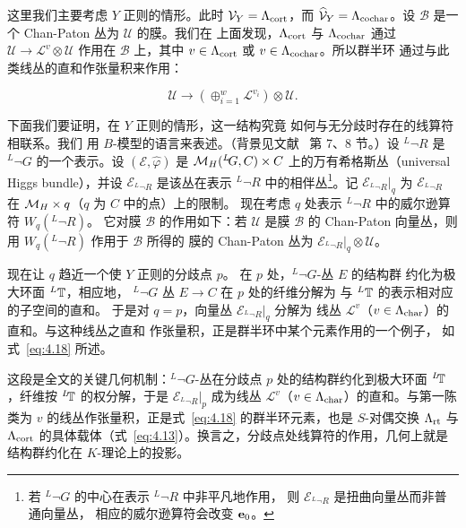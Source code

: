 这里我们主要考虑 $Y$ 正则的情形。此时 ${\mathcal
V}_Y=\Lambda_{\rm cort}$，而 $\widehat {\mathcal V}_Y=\Lambda_{\rm cochar}$。设
${\mathcal B}$ 是一个 Chan-Paton 丛为 ${\mathcal U}$ 的膜。我们在
上面发现，$\Lambda_{\rm cort}$ 与 $\Lambda_{\rm cochar}$ 通过 ${\mathcal U}\to {\mathcal L}^v\otimes {\mathcal U}$
作用在 ${\mathcal B}$ 上，其中 $v\in\Lambda_{\rm cort}$ 或 $v\in\Lambda_{\rm cochar}$。所以群半环
通过与此类线丛的直和作张量积来作用：

\setcounter{equation}{17}
\begin{equation}\label{eq:4.18}
  {\mathcal U}\to \left(\oplus_{i=1}^w{\mathcal
L}^{v_i}\right)\otimes {\mathcal U}.
\end{equation}


下面我们要证明，在 $Y$ 正则的情形，这一结构究竟
如何与无分歧时存在的线算符相联系。我们
用 $B$-模型的语言来表述。（背景见文献~\cite{ref8} 第 7、8 节。）设
$^L\neg R$ 是 $^L\neg G$ 的一个表示。设 $({\mathcal
E},\hat\varphi)$ 是 ${{\mathcal{M}}_H}(^L\negthinspace
G,C)\times C$ 上的万有希格斯丛（universal Higgs bundle），并设 ${\mathcal E}_{^L\neg R}$ 是该丛在表示
$^L\neg R$ 中的相伴丛\footnote{若 $^L\neg G$ 的中心在表示 $^L\neg R$ 中非平凡地作用，
则 ${\mathcal E}_{^L\neg R}$ 是扭曲向量丛而非普通向量丛，
相应的威尔逊算符会改变 ${\bf e}_0$。}。记 ${\mathcal E}_{^L\neg R}|_q$ 为
${\mathcal E}_{^L\neg R}$ 在 ${{\mathcal{M}}_H}\times q$（$q$ 为 $C$ 中的点）上的限制。
现在考虑 $q$ 处表示 $^L\neg R$ 中的威尔逊算符 $W_q(^L\neg R)$。
它对膜 ${\mathcal B}$ 的作用如下：若 ${\mathcal U}$ 是膜 ${\mathcal B}$
的 Chan-Paton 向量丛，则用 $W_q(^L\neg R)$ 作用于 ${\mathcal B}$ 所得的
膜的 Chan-Paton 丛为 ${\mathcal E}_{^L\neg R}|_q\otimes {\mathcal
U}$。

现在让 $q$ 趋近一个使 $Y$ 正则的分歧点 $p$。
在 $p$ 处，$^L\neg G$-丛 $E$ 的结构群
约化为极大环面 $^L{\mathbb{T}}$，相应地，
$^L\neg G$ 丛 $E\to C$ 在 $p$ 处的纤维分解为
与 $^L{\mathbb{T}}$ 的表示相对应的子空间的直和。
于是对 $q=p$，向量丛 ${\mathcal E}_{^L\neg R}|_q$ 分解为
线丛 ${\mathcal L}^v$（$v\in \Lambda_{\rm char}$）的直和。与这种线丛之直和
作张量积，正是群半环中某个元素作用的一个例子，
如式~\eqref{eq:4.18} 所述。

\begin{yizhu}[物理图像补充]这段是全文的关键几何机制：$^L\neg G$-丛在分歧点 $p$ 处的结构群约化到极大环面 $^L\negthinspace{\mathbb{T}}$，纤维按 $^L\negthinspace{\mathbb{T}}$ 的权分解，于是 $\mathcal E_{{}^L\neg R}|_p$ 成为线丛 $\mathcal L^v$（$v\in\Lambda_{\rm char}$）的直和。与第一陈类为 $v$ 的线丛作张量积，正是式~\eqref{eq:4.18} 的群半环元素，也是 $S$-对偶交换 $\Lambda_{\rm rt}$ 与 $\Lambda_{\rm cort}$ 的具体载体（式~\eqref{eq:4.13}）。换言之，分歧点处线算符的作用，几何上就是结构群约化在 $K$-理论上的投影。\end{yizhu}

